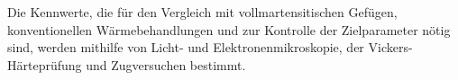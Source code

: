 Die Kennwerte, die für den Vergleich mit vollmartensitischen Gefügen, konventionellen Wärmebehandlungen und zur Kontrolle der Zielparameter nötig sind, werden mithilfe von Licht- und Elektronenmikroskopie, der Vickers-Härteprüfung und Zugversuchen bestimmt.




